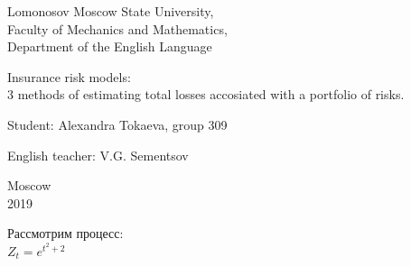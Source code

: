 \documentclass[12pt]{article}
\begin{document}
\begin{titlepage}

 \begin{center}
 Lomonosov Moscow State University, \\
 Faculty of Mechanics and Mathematics,\\
 Department of the English Language
  \end{center}

 \vspace{3cm}
 
 \begin{center}
   
  {  Insurance risk models:\\
   3 methods of estimating total losses accosiated with  a portfolio of risks.}
   
    \vspace{5cm}
\end{center}     
   
     
   \hspace{170pt}  {Student: Alexandra Tokaeva, group 309\\}
       
 \vspace{0.1cm}
  \hspace{170pt} 	  English teacher:  V.G. Sementsov\\

\vspace{4cm}

  \begin{center}
  {Moscow\\
  2019}
  \end{center}  
  
  
\end{titlepage}

Рассмотрим процесс:\\

$Z_t=e^{t^2+2}$
\end{document}
